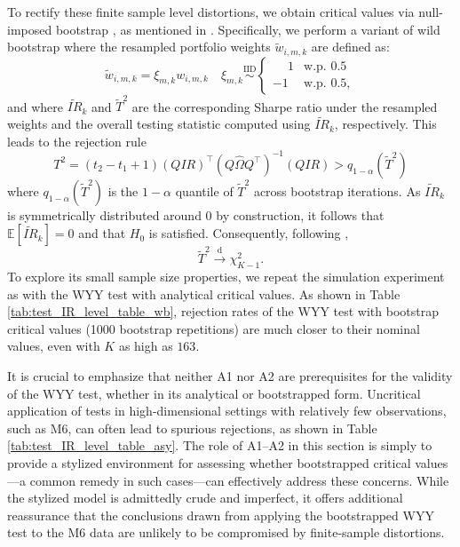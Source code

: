 \documentclass[3p,times,twocolumn]{elsarticle}
\begin{document}
To rectify these finite sample level distortions, we obtain critical values via null-imposed bootstrap \citep[see][section 1.8]{politisSubsampling1999}, as mentioned in \citet{ledoitRobustPerformanceHypothesis2008}.
Specifically, we perform a variant of wild bootstrap where the resampled portfolio weights $\tilde{w}_{i,m,k}$ are defined as:
\begin{equation}
    \tilde{w}_{i,m,k}=\xi_{m,k} w_{i,m,k} \quad \xi_{m,k}\stackrel{\text{IID}}{\sim}
\begin{cases}
    \phantom{-}1 & \text{w.p. } 0.5 \\
    -1 & \text{w.p. } 0.5,
\end{cases}
\end{equation}
and where $\tilde{IR}_{k}$ and $\tilde{T}^{2}$ are the corresponding Sharpe ratio under the resampled weights and the overall testing statistic computed using $\tilde{IR}_{k}$, respectively.
This leads to the rejection rule
\begin{equation}
    T^2 = (t_{2}-t_{1}+1)(QIR)^{\top}(Q\hat{\Omega} Q^{\top})^{-1}(QIR) > q_{1-\alpha}(\tilde{T}^{2})
\end{equation}
where $q_{1-\alpha}(\tilde{T}^{2})$ is the $1-\alpha$ quantile of $\tilde{T}^{2}$ across bootstrap iterations.
As $\tilde{IR}_{k}$ is symmetrically distributed around $0$ by construction, it follows that $\mathbb{E}[\tilde{IR}_{k}]=0$ and that $H_{0}$ is satisfied.
Consequently, following \citet{wrightTestEqualityMultiple2014}, 
\begin{equation}
    \tilde{T}^{2} \stackrel{\text{d}}{\rightarrow} \chi_{K-1}^{2}.
\end{equation}
To explore its small sample size properties, we repeat the simulation experiment as with the WYY test with analytical critical values.
As shown in Table \ref{tab:test_IR_level_table_wb}, rejection rates of the WYY test with bootstrap critical values (1000 bootstrap repetitions) are much closer to their nominal values, even with $K$ as high as $163$.


It is crucial to emphasize that neither A1 nor A2 are prerequisites for the validity of the WYY test, whether in its analytical or bootstrapped form. 
Uncritical application of tests in high-dimensional settings with relatively few observations, such as M6, can often lead to spurious rejections, as shown in Table \ref{tab:test_IR_level_table_asy}. 
The role of A1–A2 in this section is simply to provide a stylized environment for assessing whether bootstrapped critical values—a common remedy in such cases—can effectively address these concerns. 
While the stylized model is admittedly crude and imperfect, it offers additional reassurance that the conclusions drawn from applying the bootstrapped WYY test to the M6 data are unlikely to be compromised by finite-sample distortions.
\end{document}
